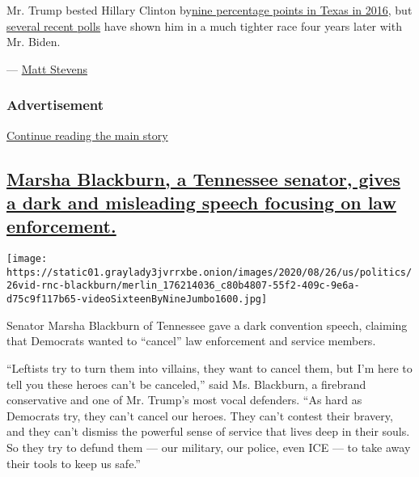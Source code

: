 Mr. Trump bested Hillary Clinton
by\href{https://cookpolitical.com/sites/default/files/2020-07/EC\%20Ratings.072320.2.pdf}{nine
percentage points in Texas in 2016}, but
\href{https://www.texasdemocrats.org/wp-content/uploads/2020/08/TexasResults-1-1.pdf}{several
recent polls} have shown him in a much tighter race four years later
with Mr. Biden.

--- \href{https://www.nytimes3xbfgragh.onion/by/matt-stevens}{Matt
Stevens}

\hypertarget{advertisement-5}{%
\subsubsection{Advertisement}\label{advertisement-5}}

\protect\hyperlink{after-dfp-ad-mid6}{Continue reading the main story}

\hypertarget{marsha-blackburn-a-tennessee-senator-gives-a-dark-and-misleading-speech-focusing-on-law-enforcement}{%
\subsection{\texorpdfstring{\protect\hyperlink{marsha-blackburn-a-tennessee-senator-gives-a-dark-and-misleading-speech-focusing-on-law-enforcement}{Marsha
Blackburn, a Tennessee senator, gives a dark and misleading speech
focusing on law
enforcement.}}{Marsha Blackburn, a Tennessee senator, gives a dark and misleading speech focusing on law enforcement.}}\label{marsha-blackburn-a-tennessee-senator-gives-a-dark-and-misleading-speech-focusing-on-law-enforcement}}

\texttt{[image: https://static01.graylady3jvrrxbe.onion/images/2020/08/26/us/politics/26vid-rnc-blackburn/merlin\_176214036\_c80b4807-55f2-409c-9e6a-d75c9f117b65-videoSixteenByNineJumbo1600.jpg]}

Senator Marsha Blackburn of Tennessee gave a dark convention speech,
claiming that Democrats wanted to ``cancel'' law enforcement and service
members.

``Leftists try to turn them into villains, they want to cancel them, but
I'm here to tell you these heroes can't be canceled,'' said Ms.
Blackburn, a firebrand conservative and one of Mr. Trump's most vocal
defenders. ``As hard as Democrats try, they can't cancel our heroes.
They can't contest their bravery, and they can't dismiss the powerful
sense of service that lives deep in their souls. So they try to defund
them --- our military, our police, even ICE --- to take away their tools
to keep us safe.''

